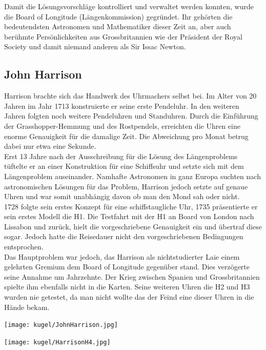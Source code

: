 \begin{refsection}
Damit die Lösungsvorschläge kontrolliert und verwaltet werden konnten, wurde die Board of Longitude (Längenkommission) gegründet. Ihr gehörten die bedeutendsten Astronomen und Mathematiker dieser Zeit an, aber auch berühmte Persönlichkeiten aus Grossbritannien wie der Präsident der Royal Society und damit niemand anderen als Sir Issac Newton.


\subsection{John Harrison}
Harrison brachte sich das Handwerk des Uhrmachers selbst bei. Im Alter von 20 Jahren im Jahr 1713 konstruierte er seine erste Pendeluhr. In den weiteren Jahren folgten noch weitere Pendeluhren und Standuhren. Durch die Einführung der Grasshopper-Hemmung und des Rostpendels, erreichten die Uhren eine enorme Genauigkeit für die damalige Zeit. Die Abweichung pro Monat betrug dabei nur etwa eine Sekunde. \\
Erst 13 Jahre nach der Ausschreibung für die Lösung des Längenproblems tüftelte er an einer Konstruktion für eine Schiffsuhr und setzte sich mit dem Längenproblem auseinander.
Namhafte Astronomen in ganz Europa suchten nach astronomischen Lösungen für das Problem, Harrison jedoch setzte auf genaue Uhren und war somit unabhängig davon ob man den Mond sah oder nicht.\\
1728 folgte sein erstes Konzept für eine schiffstaugliche Uhr, 1735 präsentierte er sein erstes Modell die H1.
Die Testfahrt mit der H1 an Board von London nach Lissabon und zurück, hielt die vorgeschriebene Genauigkeit ein und übertraf diese sogar. Jedoch hatte die Reisedauer nicht den vorgeschriebenen Bedingungen entsprochen.\\
Das Hauptproblem war jedoch, das Harrison als nichtstudierter Laie einem gelehrten Gremium dem Board of Longitude gegenüber stand. Dies verzögerte seine Annahme um Jahrzehnte. Der Krieg zwischen Spanien und Grossbritannien spielte ihm ebenfalls nicht in die Karten. Seine weiteren Uhren die H2 und H3 wurden nie getestet, da man nicht wollte das der Feind eine dieser Uhren in die Hände bekam.

\begin{center}
        \texttt{[image: kugel/JohnHarrison.jpg]}
\end{center}

\begin{center}
        \texttt{[image: kugel/HarrisonH4.jpg]}
\end{center}


\end{refsection}
